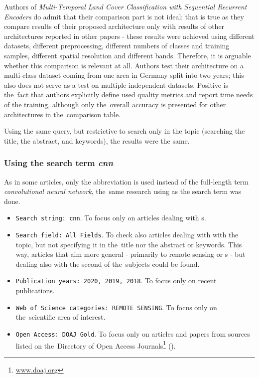 
Authors of \textit{Multi-Temporal Land Cover Classification with Sequential Recurrent Encoders} do admit that their comparison part is not ideal; that is true as they compare results of their proposed architecture only with results of other architectures reported in other papers - these results were achieved using different datasets, different preprocessing, different numbers of classes and training samples, different spatial resolution and different bands. Therefore, it is arguable whether this comparison is relevant at all. Authors test their architecture on a multi-class dataset coming from one area in Germany split into two years; this also does not serve as a test on multiple independent datasets. Positive is the~fact that authors explicitly define used quality metrics and report time needs of the training, although only the~overall accuracy is presented for other architectures in the~comparison table.

Using the same query, but restrictive to search only in the topic (searching the title, the abstract, and keywords), the results were the same.

\subsubsection{Using the search term \textit{cnn}}
\label{wos-papers-cnn}

As in some articles, only the abbreviation \textit{} is used instead of the full-length term \textit{convolutional neural network}, the~same research using \textit{} as the search term was done.

\begin{itemize}
	\item \verb|Search string: cnn|. To focus only on articles dealing with s.
	\item \verb|Search field: All Fields|. To check also articles dealing with with the topic, but not specifying it in the~title nor the abstract or keywords. This way, articles that aim more general - primarily to remote sensing or s - but dealing also with the second of the~subjects could be found.
	\item \verb|Publication years: 2020, 2019, 2018|. To focus only on recent publications.
	\item \verb|Web of Science categories: REMOTE SENSING|. To focus only on the~scien\-ti\-fic area of interest.
	\item \verb|Open Access: DOAJ Gold|. To focus only on articles and papers from sources listed on the~Di\-rectory of Open Access Journals\footnote{\url{www.doaj.org}} ().
\end{itemize}

